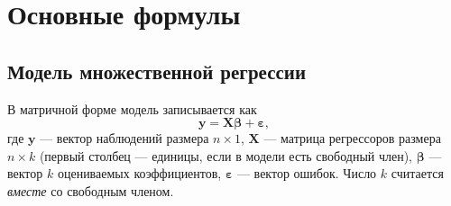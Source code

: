 %
%
%
%


\ifsolutions
\section{Основные формулы}

\subsection{Модель множественной регрессии}\label{sec:model}

В матричной форме модель записывается как
\begin{equation}
  \mathbf{y} = \mathbf{X}\boldsymbol{\beta} + \boldsymbol{\varepsilon},
  \label{eq:model}
\end{equation}
где $\mathbf{y}$ — вектор наблюдений размера $n\times 1$, $\mathbf{X}$ — матрица
регрессоров размера $n\times k$ (первый столбец — единицы, если в модели есть
свободный член), $\boldsymbol{\beta}$ — вектор $k$ оцениваемых коэффициентов,
$\boldsymbol{\varepsilon}$ — вектор ошибок. Число $k$ считается \emph{вместе} со
свободным членом.

